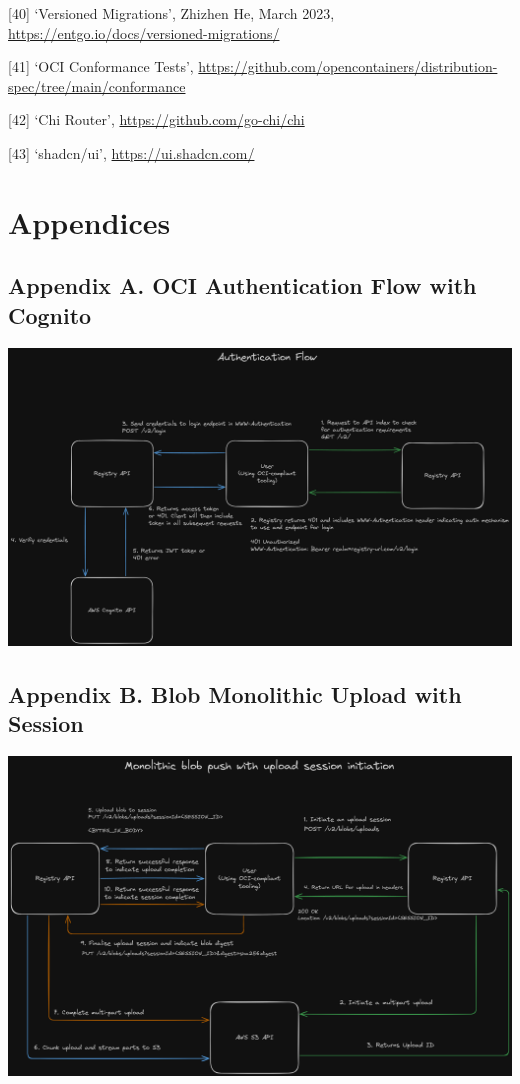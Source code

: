 \documentclass{article}
\begin{document}
  [40] `Versioned Migrations', Zhizhen He, March 2023, \url{https://entgo.io/docs/versioned-migrations/}

  [41] `OCI Conformance Tests', \url{https://github.com/opencontainers/distribution-spec/tree/main/conformance}

  [42] `Chi Router', \url{https://github.com/go-chi/chi}

  [43] `shadcn/ui', \url{https://ui.shadcn.com/}

  \section{Appendices}

  \subsection{Appendix A. OCI Authentication Flow with Cognito}
  \label{sec:appendix-a}

  \includegraphics[scale=0.25]{appendix/auth-flow.png}

  \subsection{Appendix B. Blob Monolithic Upload with Session}
  \label{sec:appendix-b}

  \includegraphics[scale=0.25]{appendix/blob-monolithic-upload-with-session.png}
\end{document}
